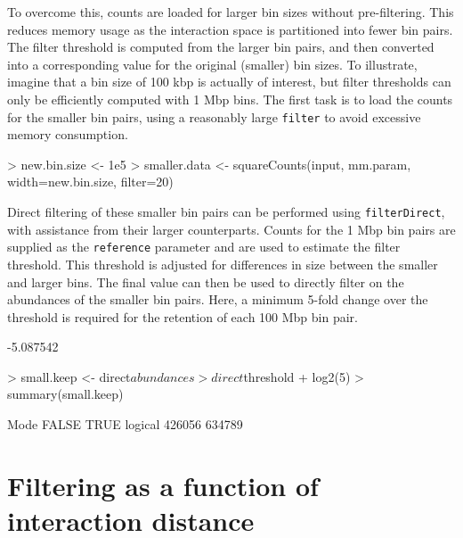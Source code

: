 \documentclass[12pt]{report}
\renewenvironment{Schunk}{\vspace{0pt}}{\vspace{0pt}}
\newcommand{\code}[1]{{\small\texttt{#1}}}
\begin{document}
To overcome this, counts are loaded for larger bin sizes without pre-filtering.
This reduces memory usage as the interaction space is partitioned into fewer bin pairs.
The filter threshold is computed from the larger bin pairs, and then converted into a corresponding value for the original (smaller) bin sizes.
To illustrate, imagine that a bin size of 100 kbp is actually of interest, but filter thresholds can only be efficiently computed with 1 Mbp bins.
The first task is to load the counts for the smaller bin pairs, using a reasonably large \code{filter} to avoid excessive memory consumption.

\begin{Schunk}
\begin{Sinput}
> new.bin.size <- 1e5
> smaller.data <- squareCounts(input, mm.param, width=new.bin.size, filter=20)
\end{Sinput}
\end{Schunk}

Direct filtering of these smaller bin pairs can be performed using \code{filterDirect}, with assistance from their larger counterparts.
Counts for the 1 Mbp bin pairs are supplied as the \code{reference} parameter and are used to estimate the filter threshold.
This threshold is adjusted for differences in size between the smaller and larger bins.
The final value can then be used to directly filter on the abundances of the smaller bin pairs.
Here, a minimum 5-fold change over the threshold is required for the retention of each 100 Mbp bin pair.

\begin{Schunk}
\begin{Soutput}
[1] -5.087542
\end{Soutput}
\begin{Sinput}
> small.keep <- direct$abundances > direct$threshold + log2(5)
> summary(small.keep)
\end{Sinput}
\begin{Soutput}
   Mode   FALSE    TRUE 
logical  426056  634789 
\end{Soutput}
\end{Schunk}

\section{Filtering as a function of interaction distance}
\end{document}
